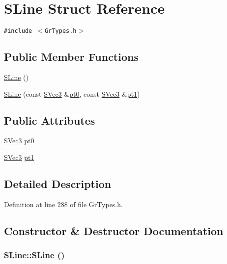 \hypertarget{struct_s_line}{
\section{SLine Struct Reference}
\label{struct_s_line}
}
{\tt \#include $<$GrTypes.h$>$}

\subsection*{Public Member Functions}
\begin{CompactItemize}
\item 
\hyperlink{struct_s_line_dcd555fa61f251dd0541881bbaa22416}{SLine} ()
\item 
\hyperlink{struct_s_line_a39ad4590b42df8aa896c5256879c636}{SLine} (const \hyperlink{struct_s_vec3}{SVec3} \&\hyperlink{struct_s_line_757820d696674d25072d491ee1e967aa}{pt0}, const \hyperlink{struct_s_vec3}{SVec3} \&\hyperlink{struct_s_line_5c00b80942438354c972a1135a2ba5f5}{pt1})
\end{CompactItemize}
\subsection*{Public Attributes}
\begin{CompactItemize}
\item 
\hyperlink{struct_s_vec3}{SVec3} \hyperlink{struct_s_line_757820d696674d25072d491ee1e967aa}{pt0}
\item 
\hyperlink{struct_s_vec3}{SVec3} \hyperlink{struct_s_line_5c00b80942438354c972a1135a2ba5f5}{pt1}
\end{CompactItemize}


\subsection{Detailed Description}


Definition at line 288 of file GrTypes.h.

\subsection{Constructor \& Destructor Documentation}
\hypertarget{struct_s_line_dcd555fa61f251dd0541881bbaa22416}{
\subsubsection[{SLine}]{\setlength{\rightskip}{0pt plus 5cm}SLine::SLine ()}}
\label{struct_s_line_dcd555fa61f251dd0541881bbaa22416}




